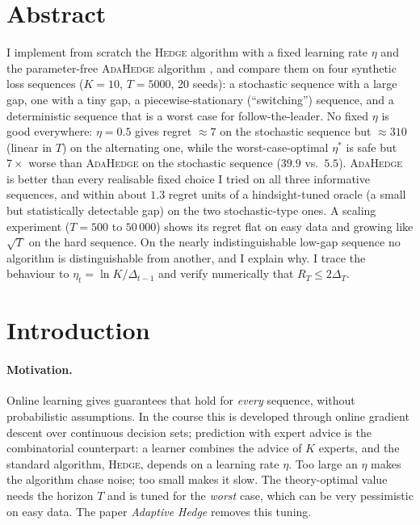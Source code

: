 \documentclass[11pt,a4paper]{article}
\newcommand{\Hedge}{\textsc{Hedge}}
\newcommand{\Ada}{\textsc{AdaHedge}}
\newcommand{\lnK}{\ln K}
\begin{document}
\section*{\centering Abstract}
I implement from scratch the \Hedge{} algorithm with a fixed learning rate $\eta$ and the parameter-free
\Ada{} algorithm \cite{vanErven2011,deRooij2014}, and compare them on four synthetic loss sequences ($K=10$, $T=5000$, 20 seeds): a stochastic
sequence with a large gap, one with a tiny gap, a piecewise-stationary (``switching'') sequence, and a deterministic sequence that is a worst case for
follow-the-leader. No fixed $\eta$ is good everywhere: $\eta=0.5$ gives regret $\approx 7$ on the stochastic sequence but $\approx 310$ (linear in $T$) on the
alternating one, while the worst-case-optimal $\eta^*$ is safe but $7\times$ worse than \Ada{} on the stochastic sequence ($39.9$ vs.\ $5.5$).
\Ada{} is better than every realisable fixed choice I tried on all three informative sequences, and within about $1.3$ regret units of a hindsight-tuned oracle
(a small but statistically detectable gap) on the two stochastic-type ones. A scaling experiment ($T=500$ to $50\,000$) shows its regret flat on easy data and growing like $\sqrt T$ on the hard sequence.
On the nearly indistinguishable low-gap sequence no algorithm is distinguishable from another, and I explain why.
I trace the behaviour to $\eta_t=\lnK/\Delta_{t-1}$ and verify numerically that $R_T\le 2\Delta_T$.

\section{Introduction}
\paragraph{Motivation.}
Online learning gives guarantees that hold for \emph{every} sequence, without probabilistic assumptions.
In the course this is developed through online gradient descent over continuous decision sets; prediction with expert advice is
the combinatorial counterpart: a learner combines the advice of $K$ experts, and the standard algorithm, \Hedge{}, depends on a learning rate $\eta$.
Too large an $\eta$ makes the algorithm chase noise; too small makes it slow. The theory-optimal value needs the horizon $T$ and
is tuned for the \emph{worst} case, which can be very pessimistic on easy data. The paper \emph{Adaptive Hedge} \cite{vanErven2011} removes this tuning.
\end{document}
